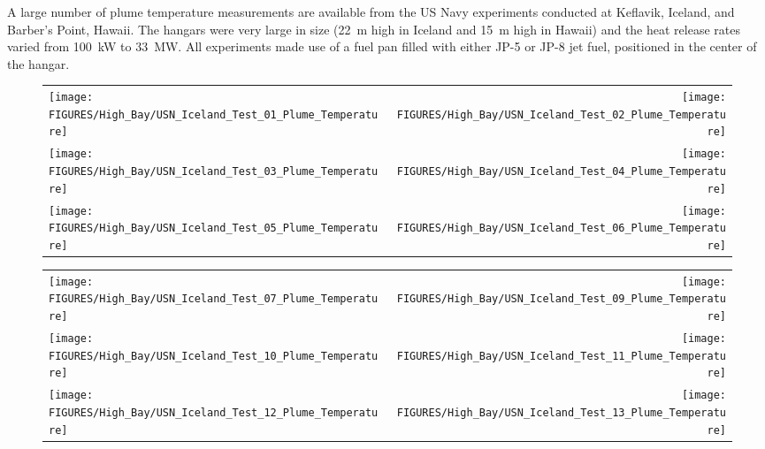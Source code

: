 \label{USN_Plume}

A large number of plume temperature measurements are available from the US Navy experiments conducted at Keflavik, Iceland, and Barber's Point, Hawaii. The hangars were very large in size (22~m high in Iceland and 15~m high in Hawaii) and the heat release rates varied from 100~kW to 33~MW. All experiments made use of a fuel pan filled with either JP-5 or JP-8 jet fuel, positioned in the center of the hangar.


\begin{figure}[h!]
\begin{tabular*}{\textwidth}{l@{\extracolsep{\fill}}r}
\texttt{[image: FIGURES/High\_Bay/USN\_Iceland\_Test\_01\_Plume\_Temperature]} &
\texttt{[image: FIGURES/High\_Bay/USN\_Iceland\_Test\_02\_Plume\_Temperature]} \\
\texttt{[image: FIGURES/High\_Bay/USN\_Iceland\_Test\_03\_Plume\_Temperature]} &
\texttt{[image: FIGURES/High\_Bay/USN\_Iceland\_Test\_04\_Plume\_Temperature]} \\
\texttt{[image: FIGURES/High\_Bay/USN\_Iceland\_Test\_05\_Plume\_Temperature]} &
\texttt{[image: FIGURES/High\_Bay/USN\_Iceland\_Test\_06\_Plume\_Temperature]} \\
\end{tabular*}
\label{USN_Plume_Iceland_Plume_Temperature}
\end{figure}

\begin{figure}[p]
\begin{tabular*}{\textwidth}{l@{\extracolsep{\fill}}r}
\texttt{[image: FIGURES/High\_Bay/USN\_Iceland\_Test\_07\_Plume\_Temperature]} &
\texttt{[image: FIGURES/High\_Bay/USN\_Iceland\_Test\_09\_Plume\_Temperature]} \\
\texttt{[image: FIGURES/High\_Bay/USN\_Iceland\_Test\_10\_Plume\_Temperature]} &
\texttt{[image: FIGURES/High\_Bay/USN\_Iceland\_Test\_11\_Plume\_Temperature]} \\
\texttt{[image: FIGURES/High\_Bay/USN\_Iceland\_Test\_12\_Plume\_Temperature]} &
\texttt{[image: FIGURES/High\_Bay/USN\_Iceland\_Test\_13\_Plume\_Temperature]} \\
\end{tabular*}
\label{USN_Plume_Iceland_2}
\end{figure}

